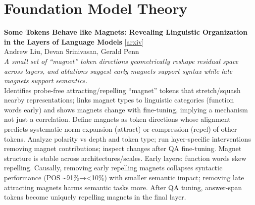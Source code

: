 \documentclass[12pt,letterpaper]{article}
\begin{document}
\medskip


\section*{Foundation Model Theory}

{\small\textbf{Some Tokens Behave like Magnets: Revealing Linguistic Organization in the Layers of Language Models}} {\scriptsize[\href{https://arxiv.org/abs/2609.05743}{arxiv}]}\\
{\scriptsize Andrew Liu, Devan Srinivasan, Gerald Penn}\\

{\small\textit{A small set of ``magnet'' token directions geometrically reshape residual space across layers, and ablations suggest early magnets support syntax while late magnets support semantics.}}\\[1pt]
{\footnotesize Identifies probe-free attracting/repelling ``magnet'' tokens that stretch/squash nearby representations; links magnet types to linguistic categories (function words early) and shows magnets change with fine-tuning, implying a mechanism not just a correlation. Define magnets as token directions whose alignment predicts systematic norm expansion (attract) or compression (repel) of other tokens. Analyze polarity vs depth and token type; run layer-specific interventions removing magnet contributions; inspect changes after QA fine-tuning. Magnet structure is stable across architectures/scales. Early layers: function words skew repelling. Causally, removing early repelling magnets collapses syntactic performance (POS \textasciitilde{}91\%→<10\%) with smaller semantic impact; removing late attracting magnets harms semantic tasks more. After QA tuning, answer-span tokens become uniquely repelling magnets in the final layer.}

\medskip
\end{document}
